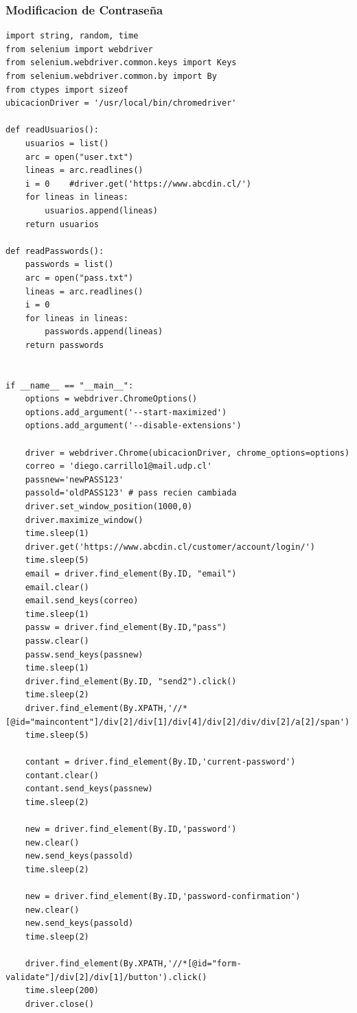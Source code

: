 \documentclass[]{article}
\begin{document}
\newpage
\subsubsection{Modificacion de Contraseña}
\begin{lstlisting}[lenguaje=py]
import string, random, time
from selenium import webdriver
from selenium.webdriver.common.keys import Keys
from selenium.webdriver.common.by import By
from ctypes import sizeof
ubicacionDriver = '/usr/local/bin/chromedriver'

def readUsuarios():
    usuarios = list()
    arc = open("user.txt")
    lineas = arc.readlines()
    i = 0    #driver.get('https://www.abcdin.cl/')
    for lineas in lineas:
        usuarios.append(lineas)
    return usuarios

def readPasswords():
    passwords = list()
    arc = open("pass.txt")
    lineas = arc.readlines()
    i = 0
    for lineas in lineas:
        passwords.append(lineas)
    return passwords


if __name__ == "__main__":
    options = webdriver.ChromeOptions()
    options.add_argument('--start-maximized')
    options.add_argument('--disable-extensions')

    driver = webdriver.Chrome(ubicacionDriver, chrome_options=options)
    correo = 'diego.carrillo1@mail.udp.cl'
    passnew='newPASS123'
    passold='oldPASS123' # pass recien cambiada
    driver.set_window_position(1000,0)
    driver.maximize_window()
    time.sleep(1)
    driver.get('https://www.abcdin.cl/customer/account/login/')
    time.sleep(5)
    email = driver.find_element(By.ID, "email")
    email.clear()
    email.send_keys(correo)
    time.sleep(1)
    passw = driver.find_element(By.ID,"pass")
    passw.clear()
    passw.send_keys(passnew)
    time.sleep(1)
    driver.find_element(By.ID, "send2").click()
    time.sleep(2)
    driver.find_element(By.XPATH,'//*[@id="maincontent"]/div[2]/div[1]/div[4]/div[2]/div/div[2]/a[2]/span').click()
    time.sleep(5)
    
    contant = driver.find_element(By.ID,'current-password')
    contant.clear()
    contant.send_keys(passnew)
    time.sleep(2)

    new = driver.find_element(By.ID,'password')
    new.clear()
    new.send_keys(passold)
    time.sleep(2)

    new = driver.find_element(By.ID,'password-confirmation')
    new.clear()
    new.send_keys(passold)
    time.sleep(2)

    driver.find_element(By.XPATH,'//*[@id="form-validate"]/div[2]/div[1]/button').click()
    time.sleep(200)
    driver.close()
\end{lstlisting}
\end{document}
